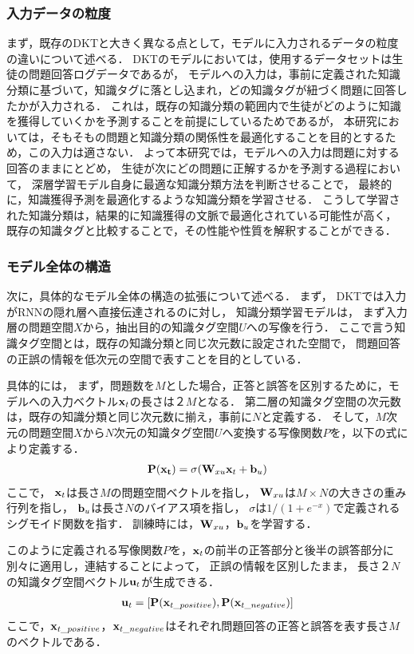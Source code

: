 \subsubsection{入力データの粒度}
まず，既存のDKTと大きく異なる点として，モデルに入力されるデータの粒度の違いについて述べる．
DKTのモデルにおいては，使用するデータセットは生徒の問題回答ログデータであるが，
モデルへの入力は，事前に定義された知識分類に基づいて，知識タグに落とし込まれ，どの知識タグが紐づく問題に回答したかが入力される．
これは，既存の知識分類の範囲内で生徒がどのように知識を獲得していくかを予測することを前提にしているためであるが，
本研究においては，そもそもの問題と知識分類の関係性を最適化することを目的とするため，この入力は適さない．
よって本研究では，モデルへの入力は問題に対する回答のままにとどめ，
生徒が次にどの問題に正解するかを予測する過程において，
深層学習モデル自身に最適な知識分類方法を判断させることで，
最終的に，知識獲得予測を最適化するような知識分類を学習させる．
こうして学習された知識分類は，結果的に知識獲得の文脈で最適化されている可能性が高く，
既存の知識タグと比較することで，その性能や性質を解釈することができる．


\subsubsection{モデル全体の構造}
次に，具体的なモデル全体の構造の拡張について述べる．
まず，
DKTでは入力がRNNの隠れ層へ直接伝達されるのに対し，
知識分類学習モデルは，
まず入力層の問題空間$X$から，抽出目的の知識タグ空間$U$への写像を行う．
ここで言う知識タグ空間とは，既存の知識分類と同じ次元数に設定された空間で，
問題回答の正誤の情報を低次元の空間で表すことを目的としている．

具体的には，
まず，問題数を$M$とした場合，正答と誤答を区別するために，モデルへの入力ベクトル${\bf x}_t$の長さは$２M$となる．
第二層の知識タグ空間の次元数は，既存の知識分類と同じ次元数に揃え，事前に$N$と定義する．
そして，$M$次元の問題空間$X$から$N$次元の知識タグ空間$U$へ変換する写像関数$P$を，以下の式により定義する．
\begin{eqnarray}
{\bf P({\bf x}_t)} = \sigma( {\bf W}_{xu} {\bf x}_t + {\bf b}_u)
\end{eqnarray}
ここで，
${\bf x}_t$は長さ$M$の問題空間ベクトルを指し，
${\bf W}_{xu}$は$M \times N$の大きさの重み行列を指し，
${\bf b}_u$は長さ$N$のバイアス項を指し，
$\sigma$は$1 / (1 + e^{-x})$で定義されるシグモイド関数を指す．
訓練時には，${\bf W}_{xu}$，${\bf b}_u$を学習する．

このように定義される写像関数$P$を，${\bf x}_t$の前半の正答部分と後半の誤答部分に別々に適用し，連結することによって，
正誤の情報を区別したまま，
長さ$２N$の知識タグ空間ベクトル${\bf u}_t$が生成できる．
\begin{eqnarray}
{\bf u}_t = [{\bf P}({\bf x}_{t\_positive}), {\bf P}({\bf x}_{t\_negative})]
\end{eqnarray}
ここで，${\bf x}_{t\_positive}$，${\bf x}_{t\_negative}$はそれぞれ問題回答の正答と誤答を表す長さ$M$のベクトルである．


